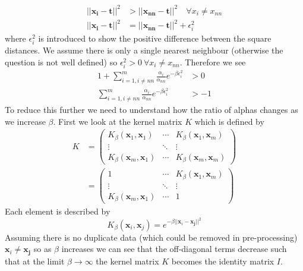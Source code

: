 \documentclass{article}
\begin{document}
\begin{enumerate}
\begin{enumerate}[label=\roman*.]
\begin{align*}
            ||\mathbf{x_{i}} - \mathbf{t}||^2 &> ||\mathbf{x_{nn}} - \mathbf{t}||^2 \quad \forall x_i \ne x_{nn}\\
            ||\mathbf{x_{i}} - \mathbf{t}||^2 &= ||\mathbf{x_{nn}} - \mathbf{t}||^2 + \epsilon_i^2
        \end{align*}
        where $\epsilon_i^2$ is introduced to show the positive difference between the square distances. We assume there is only a single nearest neighbour (otherwise the question is not well defined) so $\epsilon_i^2 > 0 \: \forall x_i \ne x_{nn}$. Therefore we see
        \begin{align}
            1 + \sum\limits_{i=1, i\ne nn}^m\frac{\alpha_{i}}{\alpha_{nn}}e^{-\beta\epsilon_i^2} &> 0 \nonumber \\
            \sum\limits_{i=1, i\ne nn}^m\frac{\alpha_{i}}{\alpha_{nn}}e^{-\beta\epsilon_i^2} &> -1
            \label{eq:kernel_inequality}
        \end{align}
        To reduce this further we need to understand how the ratio of alphas changes as we increase $\beta$. First we look at the kernel matrix $K$ which is defined by
        \begin{align*}
            K &= \begin{pmatrix}
                K_{\beta}(\mathbf{x}_1, \mathbf{x}_{1}) & \cdots & K_{\beta}(\mathbf{x}_1, \mathbf{x}_m) \\
                \vdots & \ddots & \vdots \\
                K_{\beta}(\mathbf{x}_m, \mathbf{x}_1) & \cdots & K_{\beta}(\mathbf{x}_m, \mathbf{x}_m)
                \end{pmatrix} \\
                &= \begin{pmatrix}
                1 & \cdots & K_{\beta}(\mathbf{x}_1, \mathbf{x}_m) \\
                \vdots & \ddots & \vdots \\
                K_{\beta}(\mathbf{x}_m, \mathbf{x}_1) & \cdots & 1
                \end{pmatrix}
        \end{align*}
        Each element is described by
        \begin{equation*}
            K_{\beta}(\mathbf{x}_i, \mathbf{x}_{j}) = e^{-\beta||\mathbf{x}_{i} - \mathbf{x_j}||^2}
        \end{equation*}
        Assuming there is no duplicate data (which could be removed in pre-processing)  $\mathbf{x}_{i} \ne \mathbf{x_j}$ so as $\beta$ increases we can see that the off-diagonal terms decrease such that at the limit $\beta \rightarrow \infty$ the kernel matrix $K$ becomes the identity matrix $I$.

\end{enumerate}
\end{enumerate}
\end{document}
